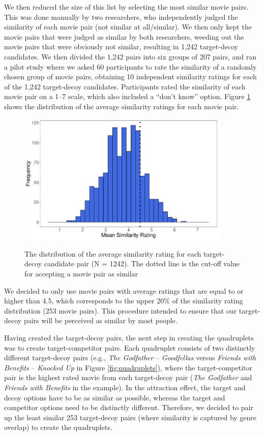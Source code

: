 \documentclass[12pt, a4paper]{article}
\begin{document}
We then reduced the size of this list by selecting the most similar movie pairs. This was done manually by two researchers, who independently judged the similarity of each movie pair (not similar at all/similar). We then only kept the movie pairs that were judged as similar by both researchers, weeding out the movie pairs that were obviously not similar, resulting in 1,242 target-decoy candidates. We then divided the 1,242 pairs into six groups of 207 pairs, and ran a pilot study where we asked 60 participants to rate the similarity of a randomly chosen group of movie pairs, obtaining 10 independent similarity ratings for each of the 1,242 target-decoy candidates. Participants rated the similarity of each movie pair on a 1--7 scale, which also included a ``don't know'' option. Figure \ref{fig:exp2_pilot}  shows the distribution of the average similarity ratings for each movie pair.

\begin{figure}[htb!]
\centering
		\caption{The distribution of the average similarity rating for each target-decoy candidate pair (N = 1242). The dotted line is the cut-off value for accepting a movie pair as similar}
\includegraphics[width=0.9\textwidth]{figure2.pdf}
\label{fig:exp2_pilot}
\end{figure}

We decided to only use movie pairs with average ratings that are equal to or higher than 4.5, which corresponds to the upper 20\% of the similarity rating distribution (253 movie pairs). This procedure intended to ensure that our target-decoy pairs will be perceived as similar by most people.

Having created the target-decoy pairs, the next step in creating the quadruplets was to create target-competitor pairs. Each quadruplet consists of two distinctly different target-decoy pairs (e.g., \textit{The Godfather} -- \textit{Goodfellas} versus \textit{Friends with Benefits} -- \textit{Knocked Up} in Figure \ref{fig:quadruplets}), where the target-competitor pair is the highest rated movie from each target-decoy pair (\textit{The Godfather} and \textit{Friends with Benefits} in the example). In the attraction effect, the target and decoy options have to be as similar as possible, whereas the target and competitor options need to be distinctly different. Therefore, we decided to pair up the least similar 253 target-decoy pairs (where similarity is captured by genre overlap) to create the quadruplets. 
\end{document}
